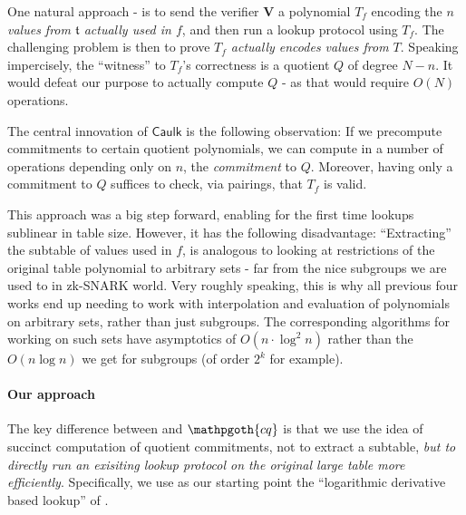 \documentclass[11pt]{article} %
\newcommand{\cq}{\ensuremath{\mathpgoth{cq} }\xspace}
\newcommand{\caulk}{\ensuremath{\mathsf{Caulk}}\xspace}
\newcommand{\ver}{\ensuremath{\mathsf{\mathbf{V}}}\xspace}
\newcommand{\witsize}{\ensuremath{n}\xspace}
\newcommand{\witruntime}{\ensuremath{\witsize\log\witsize}\xspace}
\newcommand{\tabsize}{\ensuremath{N}\xspace}
\newcommand{\tab}{\ensuremath{\mathfrak{t}}\xspace}
\begin{document}
One natural approach - is to send  the verifier \ver a polynomial $T_f$ encoding 
the \emph{\witsize values from \tab actually used in $f$}, and then run a lookup protocol using $T_f$.
The challenging problem is then to prove \emph{$T_f$ actually encodes values from $T$}.
Speaking impercisely, the ``witness'' to $T_f$'s correctness is a quotient $Q$ of degree $\tabsize-\witsize$.
It would defeat our purpose to actually compute $Q$ - as that would require $O(\tabsize)$ operations.

The central innovation of \caulk\cite{caulk} is the following observation: If we precompute commitments to certain quotient polynomials, we can compute in a number of operations depending only on \witsize, the \emph{commitment} to $Q$.
Moreover, having only a commitment to $Q$ suffices to check, via pairings, that $T_f$ is valid.




This approach was a big step forward, enabling for the first time lookups sublinear in table size.
However, it has the following disadvantage:
``Extracting'' the subtable of values used in $f$, is analogous to looking at restrictions of the original table polynomial to arbitrary sets - far
from the nice subgroups we are used to in zk-SNARK world. Very roughly speaking, this is why all previous four works end up needing to 
work with interpolation and evaluation of polynomials on arbitrary sets, rather than just subgroups. The corresponding algorithms for working on such sets have asymptotics of $O(\witsize\cdot \log^2 \witsize)$ rather than the $O(\witruntime)$ we get for subgroups (of order $2^k$ for example).

\paragraph{Our approach}
The key difference between \cite{caulk,caulkp,flookup,baloo} and \cq is that we use the idea of succinct computation
of quotient commitments, not to extract a subtable, \emph{but to directly run an exisiting lookup protocol on the original large table more efficiently}.
Specifically, we use as our starting point the ``logarithmic derivative based lookup'' of \cite{bplusplus,mvlookup}.
\end{document}
